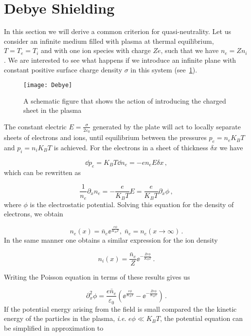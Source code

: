 \documentclass[12pt, class=report, crop=false]{standalone}
\begin{document}
\section{Debye Shielding}
In this section we will derive a common criterion for quasi-neutrality. Let us consider an infinite medium filled with plasma at thermal equilibrium, \(T=T_e = T_i\) and with one ion species with charge \(Ze\), such that we have \(n_e = Zn_i\). We are interested to see what happens if we introduce an infinite plane with constant positive surface charge density \(\sigma\) in this system (see~\cref{fig:debye}).

\begin{figure}[h]
  \centering
  \texttt{[image: Debye]}%
  \caption{A schematic figure that shows the action of introducing the charged sheet in the plasma}\label{fig:debye}%
\end{figure}

The constant electric \(E = \frac{\sigma}{2\varepsilon_0}\) generated by the plate will act to locally separate sheets of electrons and ions, until equilibrium between the pressures \(p_e = n_e K_B T\) and \(p_i = n_i K_B T \) is achieved. For the electrons in a sheet of thickness \(\delta x\) we have

\begin{equation}
  \dd{p_e} = K_B T \dd{n_e} = -e n_e E \delta x\,,
\end{equation}
which can be rewritten as

\begin{equation}
  \frac{1}{n_e} \partial_x n_e = - \frac{e}{K_B T} E = \frac{e}{K_B T} \partial_x \phi\,,
\end{equation}
where \(\phi\) is the electrostatic potential. Solving this equation for the density of electrons, we obtain

\begin{equation}
  n_e(x) = \bar{n}_e \ee^{\frac{e\phi}{K_B T}},\; \bar{n}_e = n_e(x \rightarrow \infty)\,.
\end{equation}
In the same manner one obtains a similar expression for the ion density

\begin{equation}
  n_i (x) = \frac{\bar{n}_e}{Z} \ee^{-\frac{Ze\phi}{K_B T}}\,.
\end{equation}

Writing the Poisson equation in terms of these results gives us

\begin{equation}
  \partial_x^2 \phi = \frac{e \bar{n}_e}{\varepsilon_0} \left(\ee^{\frac{e\phi}{K_B T}} - \ee^{-\frac{Ze\phi}{K_B T}} \right)\,.
\end{equation}
If the potential energy arising from the field is small compared the the kinetic energy of the particles in the plasma, \textit{i}.\textit{e}. \(e\phi\ll K_B T\), the potential equation can be simplified in approximation to
\end{document}
